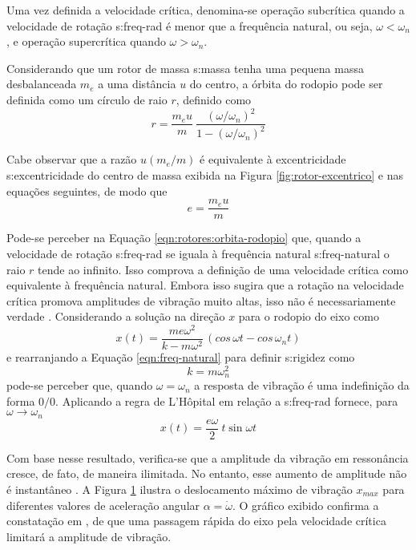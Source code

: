\documentclass[12pt,oneside,english,brazil,lmodern,siglas,simbolos,cite=num]{ucsmonograph}
\begin{document}
	Uma vez definida a velocidade crítica, denomina-se \cite{dimarogonas:1995} operação subcrítica quando a velocidade de rotação \gls{s:freq-rad} é menor que a frequência natural, ou seja, $ \omega < \omega_n $, e operação supercrítica quando $ \omega > \omega_n $.
	
	Considerando que um rotor de massa \gls{s:massa} tenha uma pequena massa desbalanceada $ m_e $ a uma distância $ u $ do centro, a órbita do rodopio pode ser definida como um círculo de raio $ r $, definido como \cite{dimarogonas:1995}
	\begin{equation} \label{eqn:rotores:orbita-rodopio}
		r = \frac{m_e u}{m}\ \frac{(\omega/\omega_n)^2}{1 - (\omega/\omega_n)^2}
	\end{equation}
	
	Cabe observar que a razão $ u(m_e/m) $ é equivalente à excentricidade \gls{s:excentricidade} do centro de massa exibida na Figura \ref{fig:rotor-excentrico} e nas equações seguintes, de modo que
	\begin{equation}
		\mathit{e} = \frac{m_e u}{m}
	\end{equation}
	
	Pode-se perceber na Equação \ref{eqn:rotores:orbita-rodopio} que, quando a velocidade de rotação \gls{s:freq-rad} se iguala à frequência natural \gls{s:freq-natural} o raio $ r $ tende ao infinito.
	Isso comprova a definição de uma velocidade crítica como equivalente à frequência natural.
	Embora isso sugira que a rotação na velocidade crítica promova amplitudes de vibração muito altas, isso não é necessariamente verdade \cite{dimarogonas:1995}.
	Considerando a solução na direção $ x $ para o rodopio do eixo como \cite{dimarogonas:1995}
	\begin{equation}
		x(t) = \frac{m\mathit{e}\omega^2}{k-m\omega^2}\,(cos\,\omega t - cos\,\omega_n t)
	\end{equation}
	e rearranjando a Equação \ref{eqn:freq-natural} para definir \gls{s:rigidez} como \[ k = m\omega_n^2 \] pode-se perceber que, quando $ \omega = \omega_n $ a resposta de vibração é uma indefinição da forma $ 0/0 $.
	Aplicando a regra de L'Hôpital em relação a \gls{s:freq-rad} fornece, para $ \omega\to\omega_n $
	\begin{equation}
		x(t) = \frac{\mathit{e}\omega}{2}\ t\sin\omega t
	\end{equation}
	
	Com base nesse resultado, verifica-se que a amplitude da vibração em ressonância cresce, de fato, de maneira ilimitada.
	No entanto, esse aumento de amplitude não é instantâneo \cite{dimarogonas:1995}.
	A Figura \ref{fig:aceleracao-vel-critica} ilustra o deslocamento máximo de vibração $ x_{max} $ para diferentes valores de aceleração angular $ \alpha = \dot{\omega} $.
	O gráfico exibido confirma a constatação em \cite{rao:2008}, de que uma passagem rápida do eixo pela velocidade crítica limitará a amplitude de vibração.
	\begin{figure}
		\label{fig:aceleracao-vel-critica}
	\end{figure}
\end{document}
